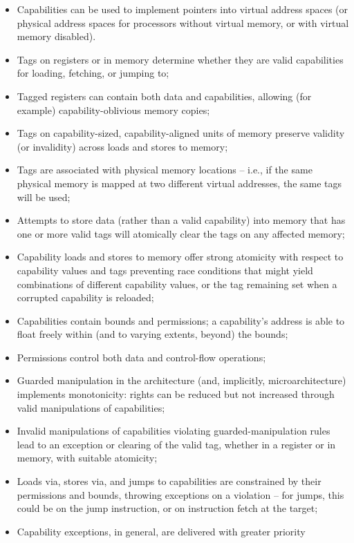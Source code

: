 \begin{itemize}
\item Capabilities can be used to implement pointers into virtual address
  spaces (or physical address spaces for processors without virtual memory,
  or with virtual memory disabled).
\item Tags on registers or in memory determine whether they are valid
  capabilities for loading, fetching, or jumping to;
\item Tagged registers can contain both data
  and capabilities, allowing (for example) capability-oblivious memory copies;
\item Tags on capability-sized, capability-aligned units of memory preserve
  validity (or invalidity) across loads and stores to memory;
\item Tags are associated with physical memory locations -- i.e., if
  the same physical memory is mapped at two different virtual addresses, the
  same tags will be used;
\item Attempts to store data (rather than a valid capability) into memory that
  has one or more valid tags will atomically clear the tags on any affected
  memory;
\item Capability loads and stores to memory offer strong atomicity with
  respect to capability values and tags preventing race
conditions
  that might yield
  combinations of different capability values, or the tag remaining set when
  a corrupted capability is reloaded;
\item Capabilities contain bounds and permissions; a capability's address is
  able to float freely within (and to varying extents, beyond) the bounds;
\item Permissions control both data and control-flow operations;
\item Guarded manipulation in the architecture (and, implicitly, microarchitecture) implements monotonicity: rights can be reduced but
  not increased through valid manipulations of capabilities;
\item Invalid manipulations of capabilities violating guarded-manipulation rules
  lead to an exception or clearing of the valid tag, whether in a register or
  in memory, with suitable atomicity;
\item Loads via, stores via, and jumps to capabilities are constrained by their
  permissions and bounds, throwing exceptions on a violation -- for jumps,
  this could be on the jump instruction, or on instruction fetch at the
  target;
\item Capability exceptions, in general, are delivered with greater priority

\end{itemize}
